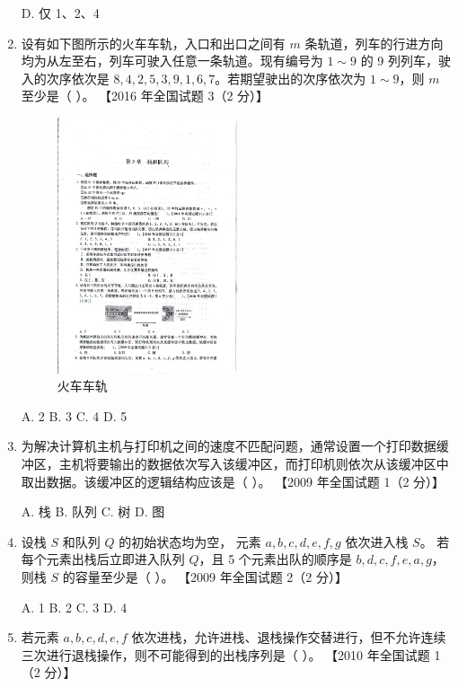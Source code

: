 \documentclass[lang=cn,newtx,10pt,scheme=chinese]{elegantbook}
\begin{document}
\begin{enumerate}
    D. 仅 1、2、4  


    \item 设有如下图所示的火车车轨，入口和出口之间有 $m$ 条轨道，列车的行进方向均为从左至右，列车可驶入任意一条轨道。现有编号为 $1 \sim 9$ 的 9 列列车，驶入的次序依次是 $8, 4, 2, 5, 3, 9, 1, 6, 7$。若期望驶出的次序依次为 $1 \sim 9$，则 $m$ 至少是（ ）。  
    【2016 年全国试题 3（2 分）】  

    \begin{figure}[h!]
        \centering
        \includegraphics[width=0.5\textwidth]{./figure/exercisePicPDF/chapter3/3-4.pdf}
        \caption{火车车轨}
        \label{fig:linear_list_2}
    \end{figure}
    A. 2 \quad B. 3 \quad C. 4 \quad D. 5  

    \item 为解决计算机主机与打印机之间的速度不匹配问题，通常设置一个打印数据缓冲区，主机将要输出的数据依次写入该缓冲区，而打印机则依次从该缓冲区中取出数据。该缓冲区的逻辑结构应该是（ ）。  
    【2009 年全国试题 1（2 分）】  
    
    A. 栈 \quad B. 队列 \quad C. 树 \quad D. 图  

    \item 设栈 $S$ 和队列 $Q$ 的初始状态均为空，
    元素 $a, b, c, d, e,f,g$ 依次进入栈 $S$。
    若每个元素出栈后立即进入队列 $Q$，且 5 个元素出队的顺序是 
    $b, d,c,f,e,a,g$，则栈 $S$ 的容量至少是（ ）。  
    【2009 年全国试题 2（2 分）】  
   
    A. 1 \quad B. 2 \quad C. 3 \quad D. 4  

    \item 若元素 $a, b, c, d, e,f$ 依次进栈，允许进栈、退栈操作交替进行，但不允许连续三次进行退栈操作，则不可能得到的出栈序列是（ ）。  
    【2010 年全国试题 1（2 分）】  


\end{enumerate}
\end{document}
